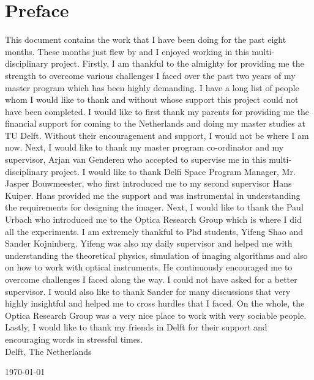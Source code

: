 \chapter*{Preface}
This document contains the work that I have been doing for the past eight months. These months just flew by and I enjoyed working in this multi-disciplinary project. Firstly, I am thankful to the almighty for providing me the strength to overcome various challenges I faced over the past two years of my master program which has been highly demanding. I have a long list of people whom I would like to thank and without whose support this project could not have been completed.
I would like to first thank my parents for providing me the financial support for coming to the Netherlands and doing my master studies at TU Delft. Without their encouragement and support, I would not be where I am now. Next, I would like to thank my master program co-ordinator and my supervisor, Arjan van Genderen who accepted to supervise me in this multi-disciplinary project. I would like to thank Delfi Space Program Manager, Mr. Jasper Bouwmeester, who first introduced me to my second supervisor Hans Kuiper. Hans provided me the support and was instrumental in understanding the requirements for designing the imager. Next, I would like to thank the Paul Urbach who introduced me to the Optica Research Group which is where I did all the experiments. I am extremely thankful to Phd students, Yifeng Shao and Sander Kojninberg. Yifeng was also my daily supervisor and helped me with understanding the theoretical physics, simulation of imaging algorithms and also on how to work with optical instruments. He continuously encouraged me to overcome challenges I faced along the way. I could not have asked for a better supervisor. I would also like to thank Sander for many discussions that very highly insightful and helped me to cross hurdles that I faced. On the whole, the Optica Research Group was a very nice place to work with very sociable people. Lastly, I would like to thank my friends in Delft for their support and encouraging words in stressful times. \\


\noindent
Delft, The Netherlands

\noindent
\today
